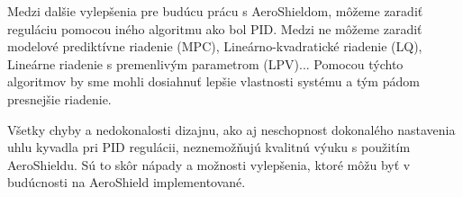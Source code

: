 Medzi dalšie vylepšenia pre budúcu prácu s AeroShieldom, môžeme zaradiť reguláciu pomocou iného algoritmu ako bol PID. Medzi ne môžeme zaradiť modelové prediktívne riadenie (MPC), Lineárno-kvadratické riadenie (LQ), Lineárne riadenie s premenlivým parametrom (LPV)... Pomocou týchto algoritmov by sme mohli dosiahnuť lepšie vlastnosti systému a tým pádom presnejšie riadenie. 

Všetky chyby a nedokonalosti dizajnu, ako aj neschopnost dokonalého nastavenia uhlu kyvadla pri PID regulácii,
neznemožňujú kvalitnú výuku s použitím AeroShieldu. Sú to skôr nápady a možnosti vylepšenia, ktoré môžu byť v budúcnosti na AeroShield implementované.